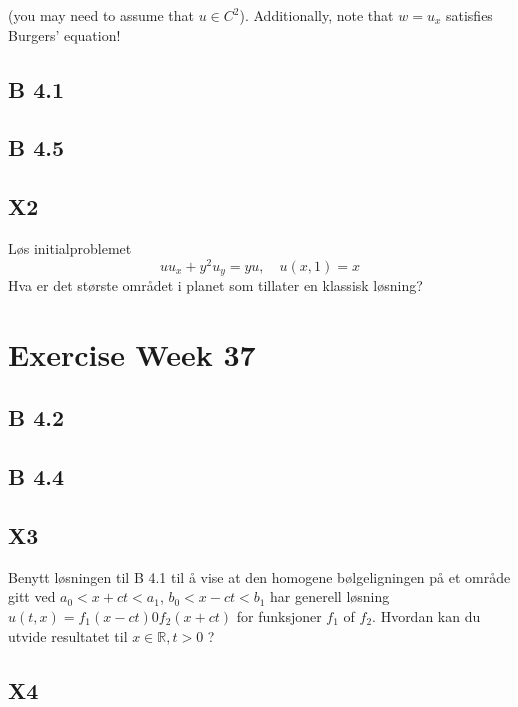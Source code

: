 \documentclass{article}
\theoremstyle{remark}
\begin{document}
\begin{tcolorbox}
 (you may need to assume that $u \in  C^{2}$). Additionally, note that $w=u_x$ satisfies Burgers' equation!
\end{tcolorbox}


\subsection{ B 4.1}%
\label{sub:problem_b_4_1}

\subsection{ B 4.5}%
\label{sub:problem_b_4_5}

\subsection{ X2}%
\label{sub:problem_x2}

Løs initialproblemet \[
u u_{x} + y^2 u_{y} = yu, \quad  u\left( x,1 \right) = x 
\] 
Hva er det største området i planet som tillater en klassisk løsning?


\newpage
\section{Exercise Week 37}%
\label{sec:exercise_week_37}

\subsection{B 4.2}%
\label{sub:b_4_2}

\subsection{B 4.4}%
\label{sub:b_4_4}

\subsection{X3}%
\label{sub:problem_x3}

Benytt løsningen til B 4.1 til å vise at den homogene bølgeligningen på et område gitt ved $a_{0} < x + ct < a_{1}$, $b_{0} < x -ct < b_{1} $ har generell løsning $u\left( t,x \right) = f_{1}\left( x-ct \right) 0 f_{2} \left( x + ct\right)$ for funksjoner $f_{1}$ of $f_{2}$. Hvordan kan du utvide resultatet til $x \in  \mathbb{R} , t >0$ ?


\subsection{X4}%
\label{sub:problem_x4}
\end{document}
